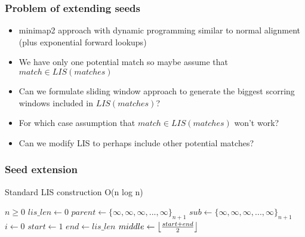 \documentclass{beamer}
\DeclarePairedDelimiter\floor{\lfloor}{\rfloor}
\begin{document}
\begin{frame}
  \frametitle{Problem of extending seeds}

  \begin{itemize}
    \item minimap2 approach with dynamic programming similar to normal alignment (plus exponential forward lookups)
    \item We have only one potential match so maybe assume that $match \in LIS(matches)$
    \item Can we formulate sliding window approach to generate the biggest scorring windows included in $LIS(matches)$?
    \item For which case assumption that $match \in LIS(matches)$ won't work?
    \item Can we modify LIS to perhaps include other potential matches?
  \end{itemize}
\end{frame}

\begin{frame}
  \frametitle{Seed extension}
  
  \begin{algorithm}[H]
      \captionsetup{font=scriptsize}
      \caption{Standard LIS construction O(n log n)}\label{alg:cap}
      \scriptsize
      \begin{algorithmic}
          \Require $n \geq 0$
          \State $lis\_len \gets 0$ 
          \State $parent \gets \{\infty, \infty, \infty, ..., \infty\}_{n+1}$ 
          \State $sub \gets \{\infty, \infty, \infty, ..., \infty\}_{n+1}$ 
          \State $i \gets 0$
           
              \State $start \gets 1$
              \State $end \gets lis\_len$
               
                  \State $middle \gets \floor*{\frac{start + end}{2}}$
                  \Else
                  \EndIf
              \EndWhile
               
              \EndIf
          \EndWhile
      \end{algorithmic}
  \end{algorithm}
\end{frame}
\end{document}
